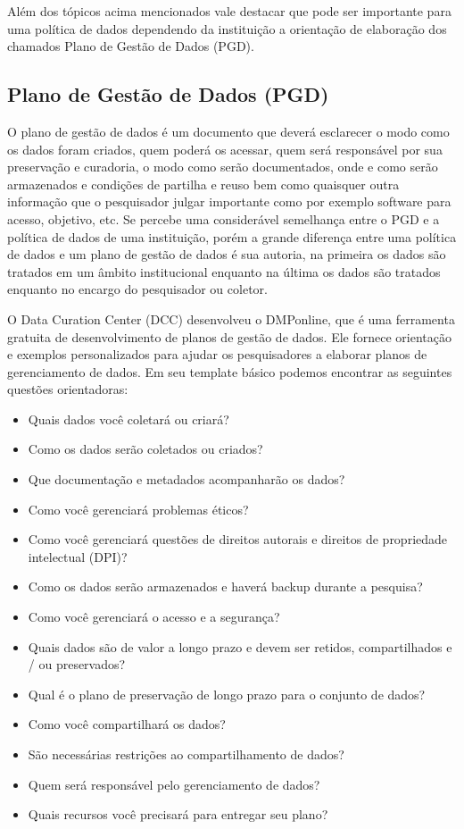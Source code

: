 \documentclass[12pt,hidelinks]{article}
\begin{document}
Além dos tópicos acima mencionados vale destacar que pode ser importante para uma política de dados dependendo da instituição a orientação de elaboração dos chamados Plano de Gestão de Dados (PGD).

\subsection{Plano de Gestão de Dados (PGD)}

\qquad O plano de gestão de dados é um documento que deverá esclarecer o modo como os dados foram criados, quem poderá os acessar, quem será responsável por sua preservação e curadoria, o modo como serão documentados, onde e como serão armazenados e condições de partilha e reuso bem como quaisquer outra informação que o pesquisador julgar importante como por exemplo software para acesso, objetivo, etc. Se percebe uma considerável semelhança entre o PGD e a política de dados de uma instituição, porém a grande diferença entre uma política de dados e um plano de gestão de dados é sua autoria, na primeira os dados são tratados em um âmbito institucional enquanto na última os dados são tratados enquanto no encargo do pesquisador ou coletor.

O Data Curation Center (DCC) desenvolveu o DMPonline, que é uma ferramenta gratuita de desenvolvimento de planos de gestão de dados. Ele fornece orientação e exemplos personalizados para ajudar os pesquisadores a elaborar planos de gerenciamento de dados. Em seu template básico podemos encontrar as seguintes questões orientadoras:

\begin{itemize}
    \item Quais dados você coletará ou criará?
    \item Como os dados serão coletados ou criados?
    \item Que documentação e metadados acompanharão os dados?
    \item Como você gerenciará problemas éticos?
    \item Como você gerenciará questões de direitos autorais e direitos de propriedade \\intelectual (DPI)?
    \item Como os dados serão armazenados e haverá backup durante a pesquisa?
    \item Como você gerenciará o acesso e a segurança?
    \item Quais dados são de valor a longo prazo e devem ser retidos, compartilhados e / ou preservados?
    \item Qual é o plano de preservação de longo prazo para o conjunto de dados?
    \item Como você compartilhará os dados?
    \item São necessárias restrições ao compartilhamento de dados?
    \item Quem será responsável pelo gerenciamento de dados?
    \item Quais recursos você precisará para entregar seu plano?
\end{itemize}
\end{document}
